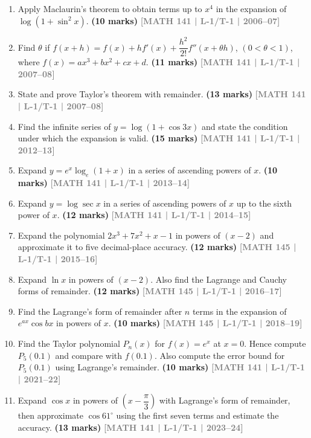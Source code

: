 \documentclass[12pt,a4paper]{article}
\newcommand{\yr}[1]{\hfill\textcolor{gray}{\small\textbf{[#1]}}}
\newcommand{\mk}[1]{\textcolor{orange!70!black}{\small\textbf{(#1 marks)}}}
\begin{document}
\begin{enumerate}

  
\item Apply Maclaurin's theorem to obtain terms up to $x^{4}$ in the expansion of $\log(1+\sin^{2}x)$.
\mk{10} \yr{MATH 141 | L-1/T-1 | 2006--07}

\item Find $\theta$ if $f(x+h)=f(x)+hf'(x)+\dfrac{h^{2}}{2!}f''(x+\theta h)$, $(0<\theta<1)$, where $f(x)=ax^{3}+bx^{2}+cx+d$.
\mk{11} \yr{MATH 141 | L-1/T-1 | 2007--08}

\item State and prove Taylor's theorem with remainder.
\mk{13} \yr{MATH 141 | L-1/T-1 | 2007--08}

\item Find the infinite series of $y=\log(1+\cos 3x)$ and state the condition under which the expansion is valid.
\mk{15} \yr{MATH 141 | L-1/T-1 | 2012--13}

\item Expand $y=e^{x}\log_{e}(1+x)$ in a series of ascending powers of $x$.
\mk{10} \yr{MATH 141 | L-1/T-1 | 2013--14}

\item Expand $y=\log\sec x$ in a series of ascending powers of $x$ up to the sixth power of $x$.
\mk{12} \yr{MATH 141 | L-1/T-1 | 2014--15}

\item Expand the polynomial $2x^{3}+7x^{2}+x-1$ in powers of $(x-2)$ and approximate it to five decimal-place accuracy.
\mk{12} \yr{MATH 145 | L-1/T-1 | 2015--16}

\item Expand $\ln x$ in powers of $(x-2)$. Also find the Lagrange and Cauchy forms of remainder.
\mk{12} \yr{MATH 145 | L-1/T-1 | 2016--17}

\item Find the Lagrange's form of remainder after $n$ terms in the expansion of $e^{ax}\cos bx$ in powers of $x$.
\mk{10} \yr{MATH 145 | L-1/T-1 | 2018--19}

\item Find the Taylor polynomial $P_{n}(x)$ for $f(x)=e^{x}$ at $x=0$. Hence compute $P_{5}(0.1)$ and compare with $f(0.1)$. Also compute the error bound for $P_{5}(0.1)$ using Lagrange's remainder.
\mk{10} \yr{MATH 141 | L-1/T-1 | 2021--22}

\item Expand $\cos x$ in powers of $\left(x-\dfrac{\pi}{3}\right)$ with Lagrange's form of remainder, then approximate $\cos 61^{\circ}$ using the first seven terms and estimate the accuracy.
\mk{13} \yr{MATH 141 | L-1/T-1 | 2023--24}

\end{enumerate}
\end{document}
